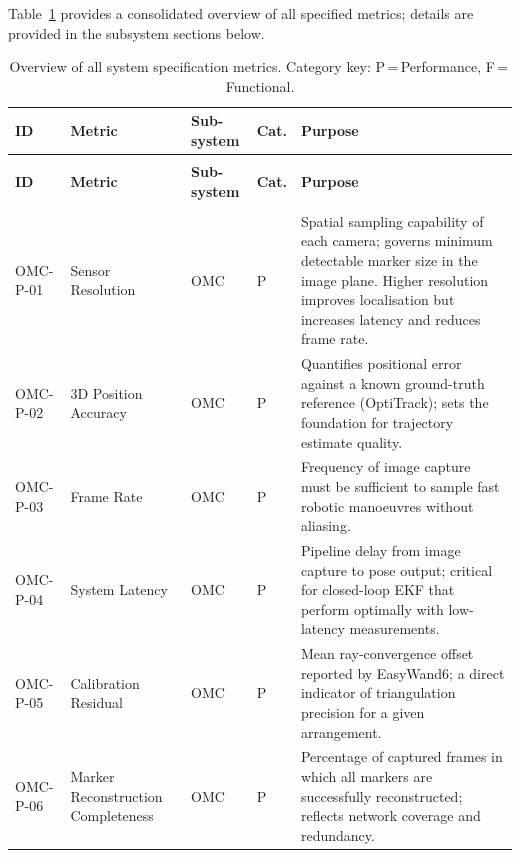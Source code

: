 Table~\ref{tab:metrics-overview} provides a consolidated overview of all specified metrics; details are provided in the subsystem sections below.

{\small\setlength{\tabcolsep}{4pt}
\begin{longtable}{>{\raggedright\arraybackslash}p{1.2cm} >{\raggedright\arraybackslash}p{2.6cm} >{\raggedright\arraybackslash}p{1.1cm} >{\raggedright\arraybackslash}p{0.9cm} >{\raggedright\arraybackslash}p{\dimexpr\linewidth-1.2cm-2.6cm-1.1cm-0.9cm-10\tabcolsep\relax}}
\caption[Overview of all system specification metrics.]{Overview of all system specification metrics. Category key: P\,=\,Performance, F\,=\,Functional.}
\label{tab:metrics-overview}\\
\toprule
\textbf{ID} & \textbf{Metric} & \textbf{Sub-system} & \textbf{Cat.} & \textbf{Purpose} \\
\midrule
\endfirsthead
\multicolumn{5}{l}{\small\textit{(Continued from previous page)}}\\[2pt]
\toprule
\textbf{ID} & \textbf{Metric} & \textbf{Sub-system} & \textbf{Cat.} & \textbf{Purpose} \\
\midrule
\endhead
\midrule
\multicolumn{5}{r}{\small\textit{(Continued on next page)}}\\
\endfoot
\bottomrule
\endlastfoot
OMC-P-01 & Sensor Resolution        & OMC & P & Spatial sampling capability of each camera; governs minimum detectable marker size in the image plane. Higher resolution improves localisation but increases latency and reduces frame rate. \\[4pt]
OMC-P-02 & 3D Position Accuracy     & OMC & P & Quantifies positional error against a known ground-truth reference (OptiTrack); sets the foundation for trajectory estimate quality. \\[4pt]
OMC-P-03 & Frame Rate               & OMC & P & Frequency of image capture must be sufficient to sample fast robotic manoeuvres without aliasing. \\[4pt]
OMC-P-04 & System Latency           & OMC & P & Pipeline delay from image capture to pose output; critical for closed-loop \gls{EKF} that perform optimally with low-latency measurements. \\[4pt]
OMC-P-05 & Calibration Residual     & OMC & P & Mean ray-convergence offset reported by EasyWand6; a direct indicator of triangulation precision for a given arrangement. \\[4pt]
OMC-P-06 & Marker Reconstruction Completeness & OMC & P & Percentage of captured frames in which all markers are successfully reconstructed; reflects network coverage and redundancy. \\

\end{longtable}}
